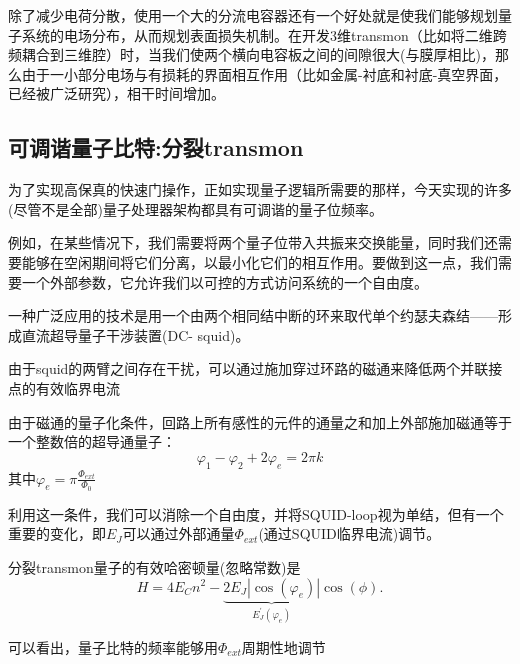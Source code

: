 \documentclass[12pt, a4paper, oneside]{ctexbook}
\newcounter{#2}
\newcounter{#2}[#1]
\numberwithin{#2}{#1}
\begin{document}
            \begin{theorem}
              除了减少电荷分散，使用一个大的分流电容器还有一个好处就是使我们能够规划量子系统的电场分布，从而规划表面损失机制。在开发3维transmon（比如将二维跨频耦合到三维腔）时，当我们使两个横向电容板之间的间隙很大(与膜厚相比)，那么由于一小部分电场与有损耗的界面相互作用（比如金属-衬底和衬底-真空界面，已经被广泛研究），相干时间增加。
            \end{theorem}

            \subsection{可调谐量子比特:分裂transmon}
            \begin{theorem}
              为了实现高保真的快速门操作，正如实现量子逻辑所需要的那样，今天实现的许多(尽管不是全部)量子处理器架构都具有可调谐的量子位频率。

              例如，在某些情况下，我们需要将两个量子位带入共振来交换能量，同时我们还需要能够在空闲期间将它们分离，以最小化它们的相互作用。要做到这一点，我们需要一个外部参数，它允许我们以可控的方式访问系统的一个自由度。

              一种广泛应用的技术是用一个由两个相同结中断的环来取代单个约瑟夫森结——形成直流超导量子干涉装置(DC- squid)。

              由于squid的两臂之间存在干扰，可以通过施加穿过环路的磁通来降低两个并联接点的有效临界电流

              由于磁通的量子化条件，回路上所有感性的元件的通量之和加上外部施加磁通等于一个整数倍的超导通量子：
              \begin{equation}
                \varphi_1-\varphi_2+2 \varphi_e=2 \pi k
              \end{equation}
              其中\(\varphi_e=\pi \frac{\Phi_{ext}}{\Phi_0}\)

              利用这一条件，我们可以消除一个自由度，并将SQUID-loop视为单结，但有一个重要的变化，即\(E_J\)可以通过外部通量\(\Phi_{ext}\)(通过SQUID临界电流)调节。

              分裂transmon量子的有效哈密顿量(忽略常数)是
              \begin{equation}\label{eqn:symtransmonH}
                H=4 E_C n^2-\underbrace{2 E_J\left|\cos \left(\varphi_e\right)\right|}_{E_J^{\prime}\left(\varphi_e\right)} \cos (\phi) .
              \end{equation}

              可以看出，量子比特的频率能够用\(\Phi_{ext}\)周期性地调节
            \end{theorem}
\end{document}
